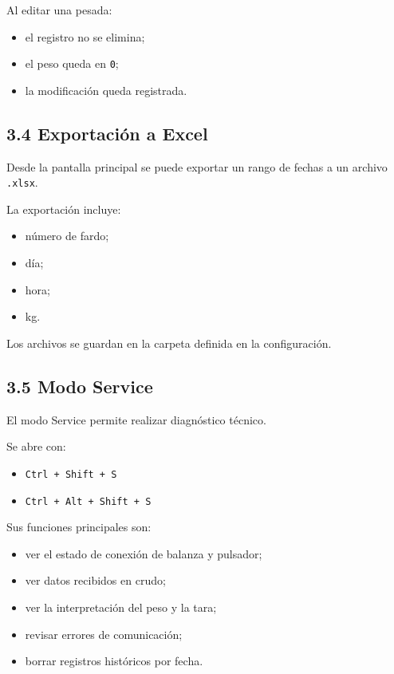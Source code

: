 \documentclass[12pt,a4paper]{article}
\begin{document}
Al editar una pesada:

\begin{itemize}
\item el registro no se elimina;
\item el peso queda en \texttt{0};
\item la modificaci\'on queda registrada.
\end{itemize}

\subsection*{3.4 Exportaci\'on a Excel}

Desde la pantalla principal se puede exportar un rango de fechas a un archivo \texttt{.xlsx}.

La exportaci\'on incluye:

\begin{itemize}
\item n\'umero de fardo;
\item d\'ia;
\item hora;
\item kg.
\end{itemize}

Los archivos se guardan en la carpeta definida en la configuraci\'on.

\subsection*{3.5 Modo Service}

El modo Service permite realizar diagn\'ostico t\'ecnico.

Se abre con:

\begin{itemize}
\item \texttt{Ctrl + Shift + S}
\item \texttt{Ctrl + Alt + Shift + S}
\end{itemize}

Sus funciones principales son:

\begin{itemize}
\item ver el estado de conexi\'on de balanza y pulsador;
\item ver datos recibidos en crudo;
\item ver la interpretaci\'on del peso y la tara;
\item revisar errores de comunicaci\'on;
\item borrar registros hist\'oricos por fecha.
\end{itemize}
\end{document}
